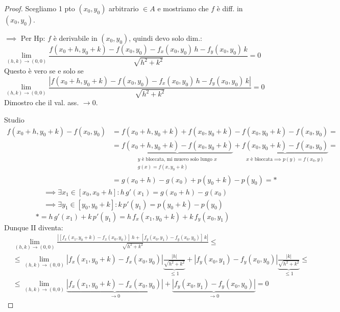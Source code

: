 \begin{proof}
Scegliamo 1 pto $(x_0, y_0)$ arbitrario $\in A$ e mostriamo che $f$ è diff. in $(x_0, y_0)$.

$\implies$ Per Hp: $f$ è derivabile in $(x_0, y_0)$, quindi devo solo dim.:
\begin{equation*}
\lim_{(h, k) \to (0, 0)} \frac{f(x_0 + h, y_0 + k) - f(x_0, y_0) - f_x(x_0, y_0)\, h - f_y(x_0, y_0)\, k}{\sqrt{h^2 + k^2}} = 0 \tag{I}
\end{equation*}
Questo è vero se e solo se
\begin{equation*}
\lim_{(h, k) \to (0, 0)} \frac{\left| f(x_0 + h, y_0 + k) - f(x_0, y_0) - f_x(x_0, y_0)\, h - f_y(x_0, y_0)\, k \right|}{\sqrt{h^2 + k^2}} = 0 \tag{II}
\end{equation*}
Dimostro che il val. ass. $\to 0$. 

Studio
\begin{align*}
f(x_0 + h, y_0 + k) - f(x_0, y_0) &= f(x_0 + h, y_0 + k) + f(x_0, y_0 + k) - f(x_0, y_0 + k) - f(x_0, y_0) = \\
&= \underbrace{f(x_0 + h, y_0 + k) - f(x_0, y_0 + k)}_{\substack{y \text{ è bloccata, mi muovo solo lungo } x \\ g(x) = f(x, y_0 + k)}} + \underbrace{f(x_0, y_0 + k) - f(x_0, y_0)}_{\substack{x \text{ è bloccata} \implies p(y) = f(x_0, y)}} = \\
&= g(x_0 + h) - g(x_0) + p(y_0 + k) - p(y_0) = *
\end{align*}
\begin{align*}
&\implies \exists x_1 \in [x_0, x_0 + h] : h\, g'(x_1) = g(x_0 + h) - g(x_0) \\
&\implies \exists y_1 \in [y_0, y_0 + k] : k\, p'(y_1) = p(y_0 + k) - p(y_0)
\end{align*}
\[
* = h\, g'(x_1) + k\, p'(y_1) = h\, f_x(x_1, y_0 + k) + k\, f_y(x_0, y_1)
\]
Dunque $\text{II}$ diventa:
\begin{align*}
&\lim_{(h, k) \to (0, 0)} \frac{\left| [f_x(x_1, y_0 + k) - f_x(x_0, y_0)]\, h + [f_y(x_0, y_1) - f_y(x_0, y_0)]\, k \right|}{\sqrt{h^2 + k^2}} \le \\
&\le \lim_{(h, k) \to (0, 0)} \left| f_x(x_1, y_0 + k) - f_x(x_0, y_0) \right| \underbrace{\frac{|h|}{\sqrt{h^2 + k^2}}}_{\le 1} + \left| f_y(x_0, y_1) - f_y(x_0, y_0) \right| \underbrace{\frac{|k|}{\sqrt{h^2 + k^2}}}_{\le 1} \le \\
&\le \lim_{(h, k) \to (0, 0)} \underbrace{\left| f_x(x_1, y_0 + k) - f_x(x_0, y_0) \right|}_{\to 0} + \underbrace{\left| f_y(x_0, y_1) - f_y(x_0, y_0) \right|}_{\to 0} = 0
\end{align*}
\end{proof}

